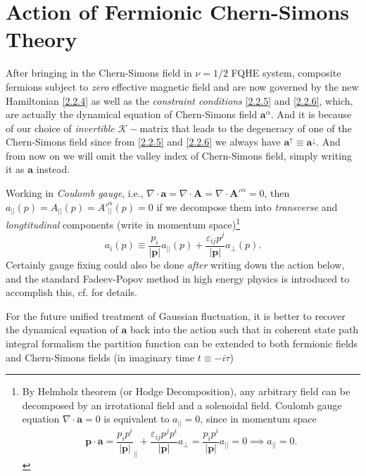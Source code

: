 \documentclass[bachelor,english,numbers]{ustcthesis}
\begin{document}
	\section{Action of Fermionic Chern-Simons Theory}
		\indent\par After bringing in the Chern-Simons field in $\nu=1/2$ FQHE system, composite fermions subject to \emph{zero} effective magnetic field and are now governed by the new Hamiltonian \eqref{2.2.4} as well as the \emph{constraint conditions} \eqref{2.2.5} and \eqref{2.2.6}, which, are actually the dynamical equation of Chern-Simons field $\bm{a}^\alpha$. And it is because of our choice of \emph{invertible} $\mathcal{K}-$matrix that leads to the degeneracy of one of the Chern-Simons field  since from \eqref{2.2.5} and \eqref{2.2.6} we always have $\bm{a}^\uparrow\equiv \bm{a}^\downarrow$. And from now on we will omit the valley index of Chern-Simons field, simply writing it as $\bm{a}$ instead.\par
		Working in \emph{Coulomb gauge}, i.e., $\nabla\cdot \bm{a}=\nabla\cdot\bm{A}=\nabla\cdot\bm{A'}^\alpha=0$, then $a_{||}(p)=A_{||}(p)={A'}^\alpha_{||}(p)=0$ if we decompose them into \emph{transverse} and \emph{longtitudinal} components (write in momentum space)\footnote{By Helmholz theorem (or Hodge Decomposition), any arbitrary field can be decomposed by an irrotational field and a solenoidal field. Coulomb gauge equation $\nabla\cdot\bm{a}=0$ is equivalent to $a_{||}=0$, since in momentum space
		\begin{equation*}
			\bm{p}\cdot\bm{a}=\dfrac{p_i p^i}{|\bm{p}|}_{||}+\dfrac{\varepsilon_{ij}p^jp^i}{|\bm{p}|}a_{\perp}=\dfrac{p_i p^i}{|\bm{p}|}a_{||}=0\implies a_{||}=0.
		\end{equation*}}
		\begin{equation}\label{2.3.0}
			a_i(p)\equiv\dfrac{p_i}{|\bm{p}|}a_{||}(p)+\dfrac{\varepsilon_{ij}p^j}{|\bm{p}|} a_{\perp}(p).
		\end{equation}
		Certainly gauge fixing could also be done \emph{after} writing down the action below, and the standard Fadeev-Popov method in high energy physics is introduced to accomplish this, cf. \cite{peskin1995introduction} for details.\par
		For the future unified treatment of Gaussian fluctuation, it is better to recover the dynamical equation of $\bm{a}$ back into the action such that in coherent state path integral formalism the partition function can be extended to both fermionic fields and Chern-Simons fields (in imaginary time $t\equiv-i\tau$)
\end{document}
